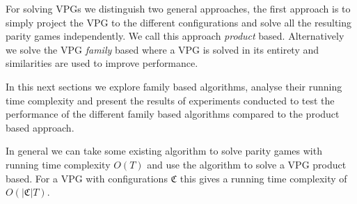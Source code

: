 For solving VPGs we distinguish two general approaches, the first approach is to simply project the VPG to the different configurations and solve all the resulting parity games independently. We call this approach \textit{product} based. Alternatively we solve the VPG \textit{family} based where a VPG is solved in its entirety and similarities are used to improve performance. 

In this next sections we explore family based algorithms, analyse their running time complexity and present the results of experiments conducted to test the performance of the different family based algorithms compared to the product based approach.

In general we can take some existing algorithm to solve parity games with running time complexity $O(T)$ and use the algorithm to solve a VPG product based. For a VPG with configurations $\mathfrak{C}$ this gives a running time complexity of $O(|\mathfrak{C}|T)$.